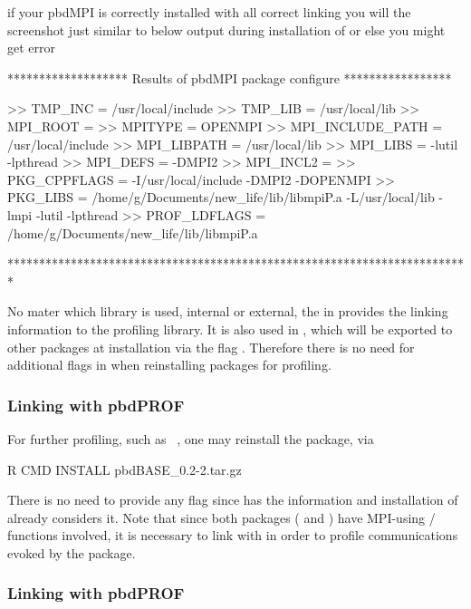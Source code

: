 if your pbdMPI is correctly installed with all correct linking you will the screenshot just similar to below output 
during installation of  or else you might get error 
\begin{Output}
******************* Results of pbdMPI package configure *****************
 
>> TMP_INC = /usr/local/include
>> TMP_LIB = /usr/local/lib
>> MPI_ROOT = 
>> MPITYPE = OPENMPI
>> MPI_INCLUDE_PATH = /usr/local/include
>> MPI_LIBPATH = /usr/local/lib
>> MPI_LIBS =  -lutil -lpthread
>> MPI_DEFS = -DMPI2
>> MPI_INCL2 = 
>> PKG_CPPFLAGS = -I/usr/local/include  -DMPI2 -DOPENMPI
>> PKG_LIBS = /home/g/Documents/new_life/lib/libmpiP.a -L/usr/local/lib -lmpi  -lutil -lpthread
>> PROF_LDFLAGS = /home/g/Documents/new_life/lib/libmpiP.a
 
*************************************************************************

\end{Output}

No mater which library is used, internal or external, the 
in  provides the linking information to the
profiling library. It is also used in , which will be
exported to other  packages at installation via the flag
.  Therefore there is no need for additional flags in
 when reinstalling packages for profiling.


\subsubsection{Linking  with pbdPROF}
\label{sec:pbdBASE}

For further profiling, such as ~\citep{Schmidt2012pbdBASEpackage}, one may
reinstall the package, via
\begin{Command}
R CMD INSTALL pbdBASE_0.2-2.tar.gz
\end{Command}
There is no need to provide any flag since  has the
information and installation of  already considers it.
Note that since both packages ( and )
have MPI-using / functions involved, it
is necessary to link with  in order to profile communications
evoked by the package.


\subsubsection{Linking  with pbdPROF}
\label{sec:Rmpi}

